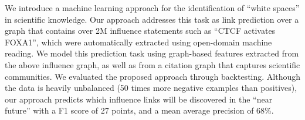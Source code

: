 We introduce a machine learning approach for the identification of ``white spaces'' in scientific knowledge. Our approach addresses this task as link prediction over a graph that contains over 2M influence statements such as ``CTCF activates FOXA1'', which were automatically extracted using open-domain machine reading. We model this prediction task using graph-based features extracted from the above influence graph, as well as from a citation graph that captures scientific communities. We evaluated the proposed approach through backtesting. Although the data is heavily unbalanced (50 times more negative examples than positives), our approach predicts which influence links will be discovered in the ``near future'' with a F1 score of 27 points, and a mean average precision of 68\%.
